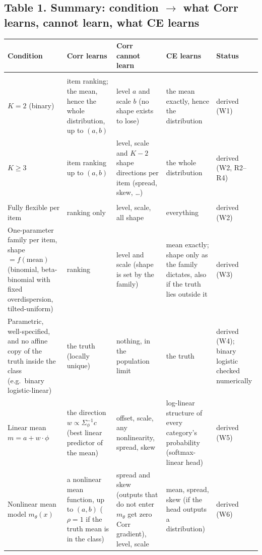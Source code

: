 \documentclass[11pt]{article}
\begin{document}
\subsection*{Table 1. Summary: condition $\to$ what Corr learns, cannot learn, what CE learns}
{\small\renewcommand{\arraystretch}{1.2}\setlength{\tabcolsep}{4pt}
\begin{longtable}{@{}>{\raggedright\arraybackslash}p{2.9cm}>{\raggedright\arraybackslash}p{3.3cm}>{\raggedright\arraybackslash}p{3.4cm}>{\raggedright\arraybackslash}p{3.4cm}>{\raggedright\arraybackslash}p{2.1cm}@{}}
\toprule
Condition & Corr learns & Corr cannot learn & CE learns & Status\\
\midrule
\multicolumn{5}{@{}l}{\textit{Rating scale (population limit, flexible class)}}\\
$K=2$ (binary) & item ranking; the mean, hence the whole distribution, up to $(a,b)$ & level $a$ and scale $b$ (no shape exists to lose) & the mean exactly, hence the distribution & derived (W1)\\
$K\ge3$ & item ranking up to $(a,b)$ & level, scale and $K-2$ shape directions per item (spread, skew, \dots) & the whole distribution & derived (W2, R2--R4)\\
\midrule
\multicolumn{5}{@{}l}{\textit{Model class (population limit, $K\ge3$)}}\\
Fully flexible per item & ranking only & level, scale, all shape & everything & derived (W2)\\
One-parameter family per item, shape $=f(\text{mean})$ (binomial, beta-binomial with fixed overdispersion, tilted-uniform) & ranking & level and scale (shape is set by the family) & mean exactly; shape only as the family dictates, also if the truth lies outside it & derived (W3)\\
Parametric, well-specified, and no affine copy of the truth inside the class (e.g.\ binary logistic-linear) & the truth (locally unique) & nothing, in the population limit & the truth & derived (W4); binary logistic checked numerically\\
Linear mean $m=a+w\!\cdot\!\phi$ & the direction $w\propto\Sigma_\phi^{-1}c$ (best linear predictor of the mean) & offset, scale, any nonlinearity, spread, skew & log-linear structure of every category's probability (softmax-linear head) & derived (W5)\\
Nonlinear mean model $m_\theta(x)$ & a nonlinear mean function, up to $(a,b)$ ($\rho=1$ if the truth mean is in the class) & spread and skew (outputs that do not enter $m_\theta$ get zero Corr gradient), level, scale & mean, spread, skew (if the head outputs a distribution) & derived (W6)\\

\end{longtable}}
\end{document}
